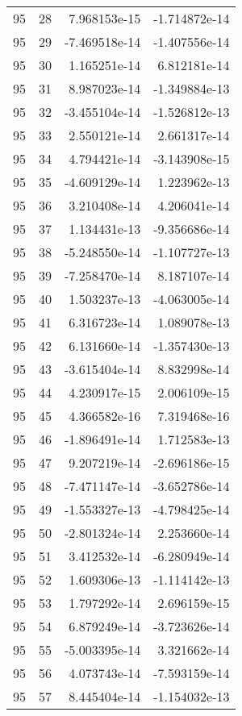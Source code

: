 \begin{tabular}{rrrr}
  95 &   28 &  7.968153e-15 & -1.714872e-14 \\
  95 &   29 & -7.469518e-14 & -1.407556e-14 \\
  95 &   30 &  1.165251e-14 &  6.812181e-14 \\
  95 &   31 &  8.987023e-14 & -1.349884e-13 \\
  95 &   32 & -3.455104e-14 & -1.526812e-13 \\
  95 &   33 &  2.550121e-14 &  2.661317e-14 \\
  95 &   34 &  4.794421e-14 & -3.143908e-15 \\
  95 &   35 & -4.609129e-14 &  1.223962e-13 \\
  95 &   36 &  3.210408e-14 &  4.206041e-14 \\
  95 &   37 &  1.134431e-13 & -9.356686e-14 \\
  95 &   38 & -5.248550e-14 & -1.107727e-13 \\
  95 &   39 & -7.258470e-14 &  8.187107e-14 \\
  95 &   40 &  1.503237e-13 & -4.063005e-14 \\
  95 &   41 &  6.316723e-14 &  1.089078e-13 \\
  95 &   42 &  6.131660e-14 & -1.357430e-13 \\
  95 &   43 & -3.615404e-14 &  8.832998e-14 \\
  95 &   44 &  4.230917e-15 &  2.006109e-15 \\
  95 &   45 &  4.366582e-16 &  7.319468e-16 \\
  95 &   46 & -1.896491e-14 &  1.712583e-13 \\
  95 &   47 &  9.207219e-14 & -2.696186e-15 \\
  95 &   48 & -7.471147e-14 & -3.652786e-14 \\
  95 &   49 & -1.553327e-13 & -4.798425e-14 \\
  95 &   50 & -2.801324e-14 &  2.253660e-14 \\
  95 &   51 &  3.412532e-14 & -6.280949e-14 \\
  95 &   52 &  1.609306e-13 & -1.114142e-13 \\
  95 &   53 &  1.797292e-14 &  2.696159e-15 \\
  95 &   54 &  6.879249e-14 & -3.723626e-14 \\
  95 &   55 & -5.003395e-14 &  3.321662e-14 \\
  95 &   56 &  4.073743e-14 & -7.593159e-14 \\
  95 &   57 &  8.445404e-14 & -1.154032e-13 \\

\end{tabular}
